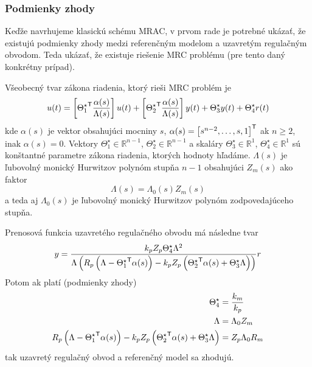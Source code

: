 \documentclass[a4paper, 10pt, ]{article}
\begin{document}
\subsubsection{Podmienky zhody}

Keďže navrhujeme klasickú schému MRAC, v prvom rade je potrebné ukázať, že existujú podmienky zhody medzi referenčným modelom a uzavretým regulačným obvodom. Teda ukázať, že existuje riešenie MRC problému (pre tento daný konkrétny prípad).

Všeobecný tvar zákona riadenia, ktorý rieši MRC problém je
\begin{equation} \label{generalControlLaw_03}
    u(t) =
    \left[{\Theta_1^\star}^{\mathsf{T}} \frac{\alpha(s)}{\Lambda(s)}\right] u(t)
    + \left[{\Theta_2^\star}^{\mathsf{T}} \frac{\alpha(s)}{\Lambda(s)}\right] y(t)
    + \Theta_3^\star y(t) + \Theta_4^\star r(t)
\end{equation}
kde $\alpha(s)$ je vektor obsahujúci mocniny $s$, $\alpha(s) = \begin{bmatrix} s^{n-2}, \ldots,s, 1 \end{bmatrix}^{\mathsf{T}}$ ak $n\geq 2$, inak $\alpha(s) = 0$. Vektory $\Theta_1^\star \in \mathbb{R}^{n-1}$, $\Theta_2^\star \in \mathbb{R}^{n-1}$ a skaláry $\Theta_3^\star \in \mathbb{R}^1$, $\Theta_4^\star \in \mathbb{R}^1$ sú konštantné parametre zákona riadenia, ktorých hodnoty hľadáme.  $\Lambda(s)$ je ľubovolný monický Hurwitzov polynóm stupňa $n-1$ obsahujúci $Z_m(s)$ ako faktor
\begin{equation}
	\Lambda(s) = \Lambda_0(s) Z_m(s)
\end{equation}
a teda aj $\Lambda_0(s)$ je ľubovolný monický Hurwitzov polynóm zodpovedajúceho stupňa.


Prenosová funkcia uzavretého regulačného obvodu má následne tvar
\begin{equation}
	y
	=
	\frac{
		k_p
		Z_p
		\Theta_4^\star
		\Lambda^2
		}{
		\Lambda
		\left(
			R_p
			\left(
				\Lambda - {\Theta_1^\star}^{\mathsf{T}}	\alpha(s)
			\right)
			-
			k_p
			Z_p
			\left(
				{\Theta_2^\star}^{\mathsf{T}}	\alpha(s)
				+
				\Theta_3^\star \Lambda
			\right)
		\right)}
	r
\end{equation}
Potom ak platí (podmienky zhody)
\begin{subequations} \label{prezpodmzhod}
	\begin{align}
		\Theta_4^\star &= \frac{k_m}{k_p} \label{idealTheta4_03a} \\
		\Lambda &= \Lambda_0 Z_m \label{lambda_03a} \\
		R_p
		\left(
			\Lambda - {\Theta_1^\star}^{\mathsf{T}} \alpha(s)
		\right)
		-
		k_p
		Z_p
		\left(
			{\Theta_2^\star}^{\mathsf{T}} \alpha(s)
			+
			\Theta_3^\star \Lambda
		\right)
	    &=
	    Z_p
	    \Lambda_0
	    R_m
	\end{align}
\end{subequations}
tak uzavretý regulačný obvod a referenčný model sa zhodujú.
\end{document}
